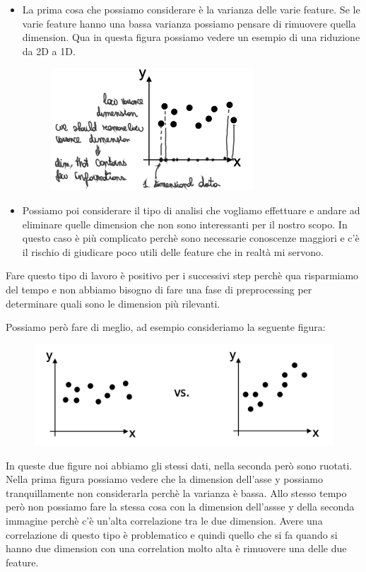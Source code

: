\documentclass[14pt]{extreport}
\begin{document}
\begin{itemize}
\item La prima cosa che possiamo considerare è la varianza delle varie feature. Se le varie feature hanno una bassa varianza
possiamo pensare di rimuovere quella dimension.
Qua in questa figura possiamo vedere un esempio di una riduzione da 2D a 1D.
\begin{figure}[H]
\centering
\includegraphics[width=0.7\linewidth]{436.jpeg}
\end{figure}
\item Possiamo poi considerare il tipo di analisi che vogliamo effettuare e andare ad eliminare quelle dimension che non 
sono interessanti per il nostro scopo. In questo caso è più complicato perchè sono necessarie conoscenze maggiori e c'è il rischio di 
giudicare poco utili delle feature che in realtà mi servono.
\end{itemize} 

Fare questo tipo di lavoro è positivo per i successivi step perchè qua risparmiamo del tempo e non abbiamo bisogno di fare una fase di
preprocessing per determinare quali sono le dimension più rilevanti.

Possiamo però fare di meglio, ad esempio consideriamo la seguente figura:
\begin{figure}[H]
\centering
\includegraphics[width=0.7\linewidth]{437.jpeg}
\end{figure}

In queste due figure noi abbiamo gli stessi dati, nella seconda però sono ruotati. 
Nella prima figura possiamo vedere che la dimension dell'asse y possiamo tranquillamente non considerarla perchè la varianza è bassa.
Allo stesso tempo però non possiamo fare la stessa cosa con la dimension dell'assse y della seconda immagine perchè c'è un'alta
correlazione tra le due dimension.
Avere una correlazione di questo tipo è problematico e quindi quello che si fa quando si hanno due dimension con una correlation 
molto alta è rimuovere una delle due feature.
\end{document}
